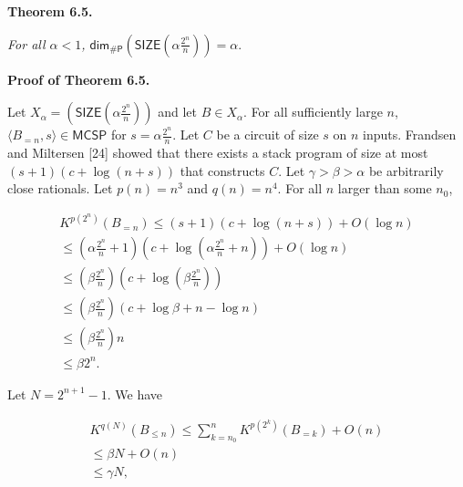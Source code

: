 \documentclass[10pt,a4paper]{article}
\begin{document}


\par\medskip\noindent\textbf{
\textbf{Theorem 6.5}\textbf{.}
}\par



\emph{For all $\alpha<1$,
${\mathsf{dim}}_{{\mathsf{\#}\mathsf{P}}}\left(\mathsf{SIZE}\!\left(\alpha\frac{2^{n}}{n}\right)\right)=\alpha.$}\par







\par\medskip\noindent\textbf{Proof of Theorem 6.5.}\par




Let $X_{\alpha}=\left(\mathsf{SIZE}\!\left(\alpha\frac{2^{n}}{n}\right)\right)$ and let $B\in X_{\alpha}$.
For all sufficiently large $n$, $\langle B_{=n},s\rangle\in\mathsf{MCSP}$ for $s=\alpha\frac{2^{n}}{n}$. Let $C$ be a circuit of size $s$ on $n$ inputs. Frandsen and Miltersen [24] showed that there exists a stack program of size at most $(s+1)(c+\log(n+s))$ that constructs $C$. Let $\gamma>\beta>\alpha$ be arbitrarily close rationals. Let $p(n)=n^{3}$ and $q(n)=n^{4}$.
For all $n$ larger than some $n_{0}$,\par


\[\begin{gathered}
\displaystyle K^{p(2^{n})}(B_{=n}) \displaystyle\leq \displaystyle(s+1)(c+\log(n+s))+O(\log n) \\
\displaystyle\leq \displaystyle\left(\alpha\frac{2^{n}}{n}+1\right)\left(c+\log\left(\alpha\frac{2^{n}}{n}+n\right)\right)+O(\log n) \\
\displaystyle\leq \displaystyle\left(\beta\frac{2^{n}}{n}\right)\left(c+\log\left(\beta\frac{2^{n}}{n}\right)\right) \\
\displaystyle\leq \displaystyle\left(\beta\frac{2^{n}}{n}\right)\left(c+\log\beta+n-\log n\right) \\
\displaystyle\leq \displaystyle\left(\beta\frac{2^{n}}{n}\right)n \\
\displaystyle\leq \displaystyle\beta 2^{n}.
\end{gathered}\]


Let $N=2^{n+1}-1$. We have\par


\[\begin{gathered}
\displaystyle K^{q(N)}(B_{\leq n}) \displaystyle\leq \displaystyle\sum_{k=n_{0}}^{n}K^{p(2^{k})}(B_{=k})+O(n) \\
\displaystyle\leq \displaystyle\beta N+O(n) \\
\displaystyle\leq \displaystyle\gamma N,
\end{gathered}\]
\end{document}
